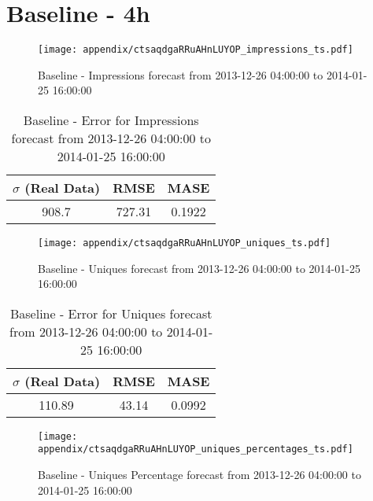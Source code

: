 \section{Baseline - 4h}
\begin{figure}[H] \begin{center} \leavevmode
\texttt{[image: appendix/ctsaqdgaRRuAHnLUYOP\_impressions\_ts.pdf]} \caption{
Baseline - Impressions forecast from 2013-12-26 04:00:00 to 2014-01-25 16:00:00} \label{fig:appendix/ctsaqdgaRRuAHnLUYOP_impressions_ts.pdf} \end{center}
\end{figure}

\begin{table}[H]
\centering
\footnotesize
\begin{tabular}{ccc}
$\sigma$ (Real Data) & RMSE & MASE   \\ \hline
908.7 & 727.31 & 0.1922 \\
\end{tabular}

\vspace{0.5cm}

\caption{
Baseline - Error for Impressions forecast from 2013-12-26 04:00:00 to 2014-01-25 16:00:00}
\end{table}

\begin{figure}[H] \begin{center} \leavevmode
\texttt{[image: appendix/ctsaqdgaRRuAHnLUYOP\_uniques\_ts.pdf]} \caption{
Baseline - Uniques forecast from 2013-12-26 04:00:00 to 2014-01-25 16:00:00} \label{fig:appendix/ctsaqdgaRRuAHnLUYOP_uniques_ts.pdf} \end{center}
\end{figure}

\begin{table}[H]
\centering
\footnotesize
\begin{tabular}{ccc}
$\sigma$ (Real Data) & RMSE & MASE   \\ \hline
110.89 & 43.14 & 0.0992 \\
\end{tabular}

\vspace{0.5cm}

\caption{
Baseline - Error for Uniques forecast from 2013-12-26 04:00:00 to 2014-01-25 16:00:00}
\end{table}

\begin{figure}[H] \begin{center} \leavevmode
\texttt{[image: appendix/ctsaqdgaRRuAHnLUYOP\_uniques\_percentages\_ts.pdf]} \caption{
Baseline - Uniques Percentage forecast from 2013-12-26 04:00:00 to 2014-01-25 16:00:00} \label{fig:appendix/ctsaqdgaRRuAHnLUYOP_uniques_percentages_ts.pdf} \end{center}
\end{figure}

